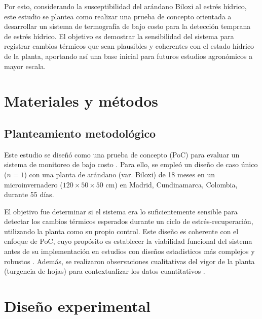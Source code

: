 Por esto, considerando la susceptibilidad del arándano Biloxi al estrés hídrico, este estudio se plantea como realizar una prueba de concepto orientada a desarrollar un sistema de termografía de bajo costo para la detección temprana de estrés hídrico. El objetivo es demostrar la sensibilidad del sistema para registrar cambios térmicos que sean plausibles y coherentes con el estado hídrico de la planta, aportando así una base inicial para futuros estudios agronómicos a mayor escala.

\section{Materiales y métodos}
\label{sec:exp_materiales_metodos}

\subsection{Planteamiento metodológico}
\label{subsec:exp_planteamiento}

Este estudio se diseñó como una prueba de concepto (PoC) para evaluar un sistema de monitoreo de bajo costo . Para ello, se empleó un diseño de caso único ($n=1$) con una planta de arándano (var. Biloxi) de 18 meses en un microinvernadero ($120 \times 50 \times 50$ cm) en Madrid, Cundinamarca, Colombia, durante 55 días.

El objetivo fue determinar si el sistema era lo suficientemente sensible para detectar los cambios térmicos esperados durante un ciclo de estrés-recuperación, utilizando la planta como su propio control. Este diseño es coherente con el enfoque de PoC, cuyo propósito es establecer la viabilidad funcional del sistema antes de su implementación en estudios con diseños estadísticos más complejos y robustos . Además, se realizaron observaciones cualitativas del vigor de la planta (turgencia de hojas) para contextualizar los datos cuantitativos .

\section{Diseño experimental}
\label{sec:exp_diseno}

